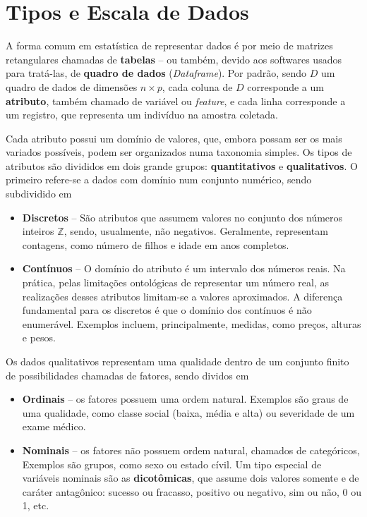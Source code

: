 \section{Tipos e Escala de Dados}

A forma comum em estatística de representar dados é por meio de matrizes retangulares
chamadas de \textbf{tabelas} -- ou também, devido aos softwares usados para tratá-las,
de \textbf{quadro de dados} (\textit{Dataframe}).
Por padrão, sendo $D$ um quadro de dados de dimensões $n \times p$, cada coluna de $D$
corresponde a um \textbf{atributo}, também chamado de variável ou \textit{feature}, e cada
linha corresponde a um registro, que representa um indivíduo na amostra coletada.

Cada atributo possui um domínio de valores, que, embora possam ser os mais variados
possíveis, podem ser organizados numa taxonomia simples.
Os tipos de atributos são divididos em dois grande grupos: \textbf{quantitativos} e
\textbf{qualitativos}.
O primeiro refere-se a dados com domínio num conjunto numérico, sendo
subdividido em

\begin{itemize}
\item \textbf{Discretos} -- São atributos que assumem valores no conjunto dos números
inteiros $\mathbb{Z}$, sendo, usualmente, não negativos.
Geralmente, representam contagens, como número de filhos e idade em anos completos.

\item \textbf{Contínuos} -- O domínio do atributo é um intervalo dos números reais.
Na prática, pelas limitações ontológicas de representar um número real, as realizações
desses atributos limitam-se a valores aproximados.
A diferença fundamental para os discretos é que o domínio dos contínuos é não enumerável.
Exemplos incluem, principalmente, medidas, como preços, alturas e pesos.
\end{itemize}

Os dados qualitativos representam uma qualidade dentro de um conjunto finito de
possibilidades chamadas de fatores, sendo dividos em
\begin{itemize}
\item \textbf{Ordinais} -- os fatores possuem uma ordem natural.
Exemplos são graus de uma qualidade, como classe social (baixa, média e alta) ou
severidade de um exame médico.

\item \textbf{Nominais} -- os fatores não possuem ordem natural, chamados de categóricos,
Exemplos são grupos, como sexo ou estado cívil.
Um tipo especial de variáveis nominais são as \textbf{dicotômicas}, que assume dois
valores somente e de caráter antagônico: sucesso ou fracasso, positivo ou negativo,
sim ou não, 0 ou 1, etc.
\end{itemize}

